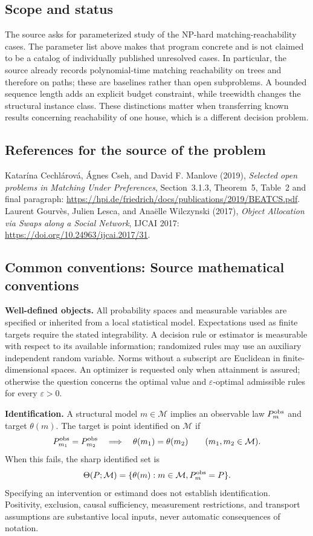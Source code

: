 \documentclass[11pt,a4paper]{article}
\begin{document}
\subsection*{Scope and status}
The source asks for parameterized study of the NP-hard matching-reachability cases. The parameter list above makes that program concrete and is not claimed to be a catalog of individually published unresolved cases. In particular, the source already records polynomial-time matching reachability on trees and therefore on paths; these are baselines rather than open subproblems. A bounded sequence length adds an explicit budget constraint, while treewidth changes the structural instance class. These distinctions matter when transferring known results concerning reachability of one house, which is a different decision problem.
\subsection*{References for the source of the problem}
Katar\'ina Cechl\'arov\'a, \'Agnes Cseh, and David F. Manlove (2019), \emph{Selected open problems in Matching Under Preferences}, Section~3.1.3, Theorem~5, Table~2 and final paragraph: \url{https://hpi.de/friedrich/docs/publications/2019/BEATCS.pdf}. Laurent Gourv\`es, Julien Lesca, and Ana\"elle Wilczynski (2017), \emph{Object Allocation via Swaps along a Social Network}, IJCAI 2017: \url{https://doi.org/10.24963/ijcai.2017/31}.

\subsection*{Common conventions: Source mathematical conventions}

\textbf{Well-defined objects.}
All probability spaces and measurable variables are specified or inherited
from a local statistical model. Expectations used as finite targets require
the stated integrability. A decision rule or estimator is measurable with
respect to its available information; randomized rules may use an auxiliary
independent random variable. Norms without a subscript are Euclidean in
finite-dimensional spaces. An optimizer is requested only when attainment
is assured; otherwise the question concerns the optimal value and
$\varepsilon$-optimal admissible rules for every $\varepsilon>0$.

\textbf{Identification.}
A structural model $m\in\mathcal M$ implies an observable law
$P_m^{\rm obs}$ and target $\theta(m)$. The target is point identified on
$\mathcal M$ if
\[
 P_{m_1}^{\rm obs}=P_{m_2}^{\rm obs}
 \quad\Longrightarrow\quad\theta(m_1)=\theta(m_2)
 \qquad(m_1,m_2\in\mathcal M).
\]
When this fails, the sharp identified set is
\[
 \Theta(P;\mathcal M)=\{\theta(m):m\in\mathcal M,
                                  P_m^{\rm obs}=P\}.
\]
Specifying an intervention or estimand does not establish identification.
Positivity, exclusion, causal sufficiency, measurement restrictions, and
transport assumptions are substantive local inputs, never automatic
consequences of notation.
\end{document}
